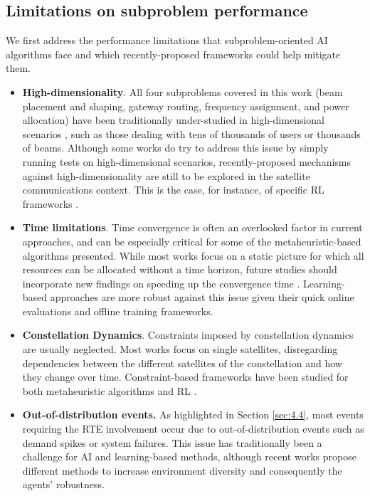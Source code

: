 \documentclass[letterpaper]{article} %
\begin{document}
\subsection{Limitations on subproblem performance}
We first address the performance limitations that subproblem-oriented AI algorithms face and which recently-proposed frameworks could help mitigate them.
\begin{itemize}
    \item \textbf{High-dimensionality}. All four subproblems covered in this work (beam placement and shaping, gateway routing, frequency assignment, and power allocation) have been traditionally under-studied in high-dimensional scenarios \cite{Luis2020}, such as those dealing with tens of thousands of users or thousands of beams. Although some works do try to address this issue \cite{hu2020dynamic, Luis2019} by simply running tests on high-dimensional scenarios, recently-proposed mechanisms against high-dimensionality are still to be explored in the satellite communications context. This is the case, for instance, of specific RL frameworks \cite{van2020q, zahavy2018learn}.

    \item \textbf{Time limitations}. Time convergence is often an overlooked factor in current approaches, and can be especially critical for some of the metaheuristic-based algorithms presented. While most works focus on a static picture for which all resources can be allocated without a time horizon, future studies should incorporate new findings on speeding up the convergence time \cite{nia2009speeding}. Learning-based approaches are more robust against this issue given their quick online evaluations and offline training frameworks.

    \item \textbf{Constellation Dynamics}. Constraints imposed by constellation dynamics are usually neglected. Most works focus on single satellites, disregarding dependencies between the different satellites of the constellation and how they change over time. Constraint-based frameworks have been studied for both metaheuristic algorithms \cite{homaifar1994constrained} and RL \cite{garcia2015comprehensive, dalal2018safe, Bohez2019}.

    \item \textbf{Out-of-distribution events.} As highlighted in Section \ref{sec:4.4}, most events requiring the RTE involvement occur due to out-of-distribution events such as demand spikes or system failures. This issue has traditionally been a challenge for AI and learning-based methods, although recent works propose different methods to increase environment diversity \cite{Ghosh2017, Lee2019, Tobin2017} and consequently the agents' robustness.
\end{itemize}
\end{document}
